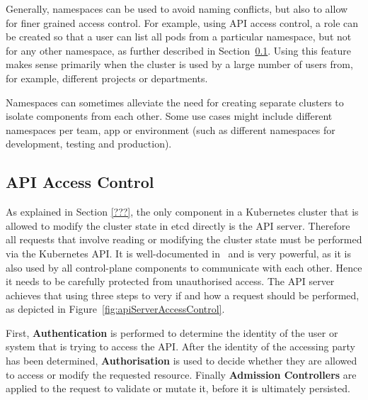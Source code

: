 Generally, namespaces can be used to avoid naming conflicts, but also to allow for finer grained access control. For example, using API access control, a role can be created so that a user can list all pods from a particular namespace, but not for any other namespace, as further described in Section~\ref{sec:apiAccessControl}. Using this feature makes sense primarily when the cluster is used by a large number of users from, for example, different projects or departments. 

Namespaces can sometimes alleviate the need for creating separate clusters to isolate components from each other. Some use cases might include different namespaces per team, app or environment (such as different namespaces for development, testing and production). 


\subsection{API Access Control} \label{sec:apiAccessControl}

As explained in Section \ref{???}, the only component in a Kubernetes cluster that is allowed to modify the cluster state in etcd directly is the API server. Therefore all requests that involve reading or modifying the cluster state must be performed via the Kubernetes API. It is well-documented in~\textcite{k8sdocsApi} and is very powerful, as it is also used by all control-plane components to communicate with each other. Hence it needs to be carefully protected from unauthorised access. The API server achieves that using three steps to very if and how a request should be performed, as depicted in Figure~\ref{fig:apiServerAccessControl}.


First, \textbf{Authentication} is performed to determine the identity of the user or system that is trying to access the API. After the identity of the accessing party has been determined, \textbf{Authorisation} is used to decide whether they are allowed to access or modify the requested resource. Finally \textbf{Admission Controllers} are applied to the request to validate or mutate it, before it is ultimately persisted.

